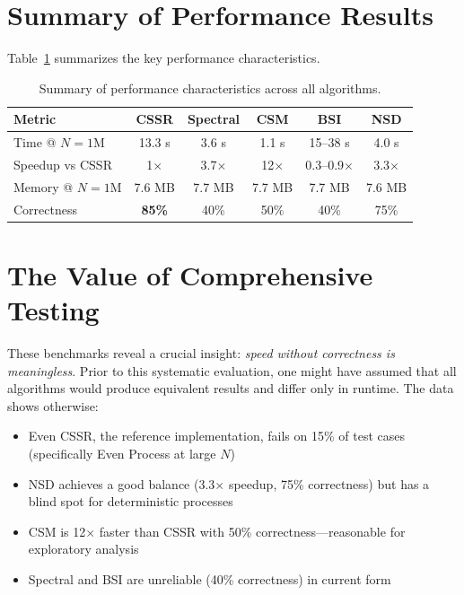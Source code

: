\documentclass[11pt,a4paper]{report}
\theoremstyle{definition}
\theoremstyle{plain}
\begin{document}
\section{Summary of Performance Results}

Table~\ref{tab:perf-summary} summarizes the key performance characteristics.

\begin{table}[htbp]
\centering
\begin{tabular}{lccccc}
\toprule
\textbf{Metric} & \textbf{CSSR} & \textbf{Spectral} & \textbf{CSM} & \textbf{BSI} & \textbf{NSD} \\
\midrule
Time @ $N=1$M & 13.3 s & 3.6 s & 1.1 s & 15--38 s & 4.0 s \\
Speedup vs CSSR & 1$\times$ & 3.7$\times$ & 12$\times$ & 0.3--0.9$\times$ & 3.3$\times$ \\
Memory @ $N=1$M & 7.6 MB & 7.7 MB & 7.7 MB & 7.7 MB & 7.6 MB \\
Correctness & \textbf{85\%} & 40\% & 50\% & 40\% & 75\% \\
\bottomrule
\end{tabular}
\caption{Summary of performance characteristics across all algorithms.}
\label{tab:perf-summary}
\end{table}

\section{The Value of Comprehensive Testing}

These benchmarks reveal a crucial insight: \emph{speed without correctness is meaningless}. Prior to this systematic evaluation, one might have assumed that all algorithms would produce equivalent results and differ only in runtime. The data shows otherwise:

\begin{itemize}
    \item Even CSSR, the reference implementation, fails on 15\% of test cases (specifically Even Process at large $N$)
    \item NSD achieves a good balance (3.3$\times$ speedup, 75\% correctness) but has a blind spot for deterministic processes
    \item CSM is 12$\times$ faster than CSSR with 50\% correctness---reasonable for exploratory analysis
    \item Spectral and BSI are unreliable (40\% correctness) in current form
\end{itemize}
\end{document}
